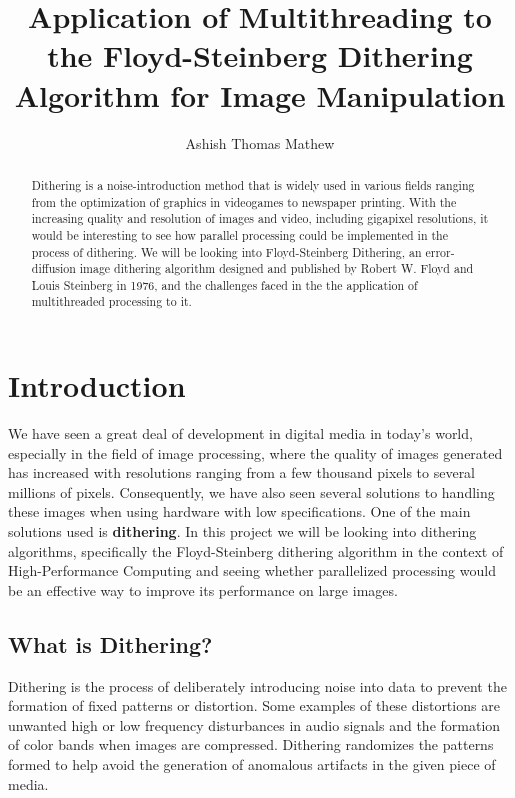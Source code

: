 \documentclass{article}
\title{Application of Multithreading to the Floyd-Steinberg Dithering Algorithm for Image Manipulation}
\author{Ashish Thomas Mathew}
\date{}
\begin{document}
\maketitle
\begin{abstract}
    \noindent Dithering is a noise-introduction method that is widely used in various fields ranging from the optimization of graphics in videogames to newspaper printing. With the increasing quality and resolution of images and video, including gigapixel resolutions, it would be interesting to see how parallel processing could be implemented in the process of dithering. We will be looking into Floyd-Steinberg Dithering, an error-diffusion image dithering algorithm designed and published by Robert W. Floyd and Louis Steinberg in 1976, and the challenges faced in the the application of multithreaded processing to it.  
\end{abstract}

\section{Introduction}\label{Introduction}

We have seen a great deal of development in digital media in today's world, especially in the field of image processing, where the quality of images generated has increased with resolutions ranging from a few thousand pixels to several millions of pixels. Consequently, we have also seen several solutions to handling these images when using hardware with low specifications. One of the main solutions used is \textbf{dithering}. In this project we will be looking into dithering algorithms, specifically the Floyd-Steinberg dithering algorithm\cite{Steinberg} in the context of High-Performance Computing and seeing whether parallelized processing would be an effective way to improve its performance on large images.

\subsection{What is Dithering?}\label{Dithering Intro}

Dithering is the process of deliberately introducing noise into data to prevent the formation of fixed patterns or distortion. Some examples of these distortions are unwanted high or low frequency disturbances in audio signals and the formation of color bands when images are compressed. Dithering randomizes the patterns formed to help avoid the generation of anomalous artifacts in the given piece of media.
\end{document}
